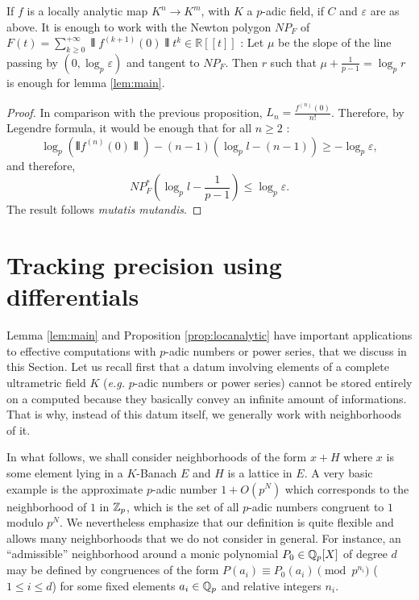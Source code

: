 \documentclass{lms}
\begin{document}
\begin{prop} \label{prop:locanalyticfinitedim}
If $f$ is a locally analytic map $K^n \rightarrow K^m$, with $K$ a $p$-adic field, if $C$ and $\varepsilon$ are as above. It is enough to work with the Newton polygon $NP_F$ of $F(t) = \sum_{k\geq 0}^{+\infty} \interleave f^{(k+1)}(0) \interleave  t^k \in \mathbb{R}[[t]]$ : Let $\mu$ be the slope of the line passing by $(0, \log_p \varepsilon)$ and tangent to $NP_F$.
Then $r$ such that $\mu+\frac{1}{p-1}=\log_p r$ is enough for lemma \ref{lem:main}. 
\end{prop}
\begin{proof}
In comparison with the previous proposition, $L_n=\frac{f^{(n)}(0)}{n!}$. Therefore, by Legendre formula, it would be enough that for all $n \geq 2$ :
\[\log_p (\interleave f^{(n)}(0) \interleave )-(n-1) (\log_p l-(n-1)) \geq - \log_p \varepsilon,\]
and therefore, \[ NP_F^* \left( \log_p l - \frac{1}{p-1} \right) \leq \log_p \varepsilon.\]
The result follows \textit{mutatis mutandis}.
\end{proof}


\section{Tracking precision using differentials}
\label{sec:tracking}

Lemma \ref{lem:main} and Proposition \ref{prop:locanalytic} have 
important applications to effective computations with $p$-adic numbers 
or power series, that we discuss in this Section. Let us recall first 
that a datum involving elements of a complete ultrametric field $K$ 
(\emph{e.g.} $p$-adic numbers or power series) cannot be stored entirely 
on a computed because they basically convey an infinite amount of 
informations. That is why, instead of this datum itself, we generally 
work with neighborhoods of it.

In what follows, we shall consider neighborhoods of the form $x + H$ 
where $x$ is some element lying in a $K$-Banach $E$ and $H$ is a lattice 
in $E$. A very basic example is the approximate $p$-adic number $1 + 
O(p^N)$ which corresponds to the neighborhood of $1$ in $\mathbb Z_p$, which is 
the set of all $p$-adic numbers congruent to $1$ modulo $p^N$. We 
nevertheless emphasize that our definition is quite flexible and allows 
many neighborhoods that we do not consider in general. For instance, an 
``admissible'' neighborhood around a monic polynomial $P_0 \in \mathbb Q_p[X]$ 
of degree $d$ may be defined by congruences of the form $P(a_i) \equiv 
P_0(a_i) \pmod {p^{n_i}}$ ($1 \leq i \leq d$) for some fixed elements 
$a_i \in \mathbb Q_p$ and relative integers $n_i$.
\end{document}
